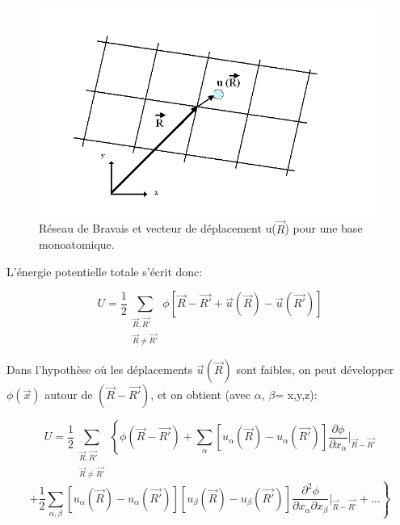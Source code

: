 \begin{figure}[H]
	\centering
	\includegraphics[scale=0.7]{image/reseauB}
	\caption[Réseau de Bravais et vecteur de déplacement pour une base monoatomique]{Réseau de Bravais et vecteur de déplacement u($\overrightarrow{R}$) pour une base monoatomique.}
\end{figure}



L'énergie potentielle totale s'écrit donc:

\begin{equation}
U = \frac{1}{2} \sum_{\substack{\overrightarrow{R},\overrightarrow{R'}\\ \overrightarrow{R}\neq \overrightarrow{R'}}} \phi [\overrightarrow{R} - \overrightarrow{R'} + \overrightarrow{u}(\overrightarrow{R})- \overrightarrow{u}(\overrightarrow{R'})]
\end{equation}

Dans l'hypothèse où les déplacements $\overrightarrow{u}(\overrightarrow{R})$ sont faibles, on peut développer $\phi(\overrightarrow{x})$ autour de $(\overrightarrow{R}-\overrightarrow{R'})$, et on obtient (avec $\alpha$, $\beta$= x,y,z):

\begin{equation*}
U = \frac{1}{2}\sum_{\substack{\overrightarrow{R},\overrightarrow{R'}\\ \overrightarrow{R}\neq \overrightarrow{R'}}} \left\{\phi(\overrightarrow{R}-\overrightarrow{R'}) + \sum_{\alpha} [u_{\alpha}(\overrightarrow{R})- u_{\alpha}(\overrightarrow{R'})] \frac{\partial\phi}{\partial x_{\alpha}}\Big|_{\overrightarrow{R}-\overrightarrow{R'}}\right.
\end{equation*}
\begin{equation}
\left.+\frac{1}{2} \sum_{\alpha,\beta}[u_{\alpha}(\overrightarrow{R})-u_{\alpha}(\overrightarrow{R'})][u_{\beta}(\overrightarrow{R})-u_{\beta}(\overrightarrow{R'})] \frac{\partial^{2}\phi}{\partial x_{\alpha} \partial x_{\beta}}\Big|_{\overrightarrow{R}-\overrightarrow{R'}} + \ldots\right\} \label{equation1}
\end{equation}

